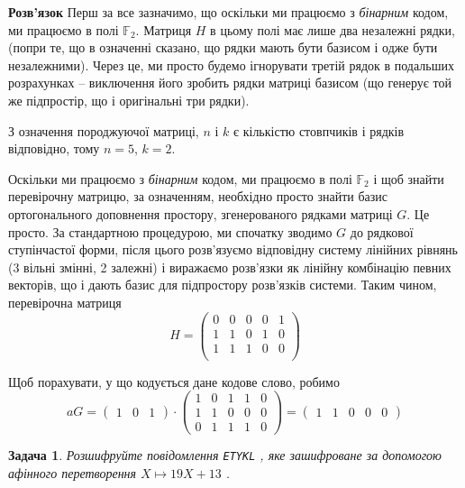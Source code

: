 \documentclass[12pt]{article} %
\newtheorem{problem}{Задача}
\newenvironment{solution}%
{\par\textbf{Розв'язок}\space }%
{\par}
\begin{document}
\begin{solution}
	Перш за все зазначимо, що оскільки ми працюємо з \textit{бінарним} кодом, ми працюємо в полі $\mathbb{F}_2$. Матриця $H$ в цьому полі має лише два незалежні рядки,
	(попри те, що в означенні сказано, що рядки мають бути базисом і одже бути незалежними). Через це, ми просто будемо ігнорувати третій рядок в подальших розрахунках --
	виключення його зробить рядки матриці базисом (що генерує той же підпростір, що і оригінальні три рядки).

	З означення породжуючої матриці, $n$ і $k$ є кількістю стовпчиків і рядків відповідно, тому $n=5$, $k=2$.

	Оскільки ми працюємо з \textit{бінарним} кодом, ми працюємо в полі $\mathbb{F}_2$ і щоб знайти перевірочну матрицю, за означенням, необхідно просто знайти базис 
	ортогонального доповнення простору, згенерованого рядками матриці $G$. Це просто. За стандартною процедурою, ми спочатку зводимо $G$ до рядкової ступінчастої форми,
	після цього розв'язуємо відповідну систему лінійних рівнянь (3 вільні змінні, 2 залежні) і виражаємо розв'язки як лінійну комбінацію певних векторів, що і дають базис
	для підпростору розв'язків системи. Таким чином, перевірочна матриця
	\[H =\begin{pmatrix}
	0 & 0 & 0 & 0 & 1\\
	1 & 1 & 0 & 1 & 0\\
	1 & 1 & 1 & 0 & 0\\
	\end{pmatrix}
	\]

	Щоб порахувати, у що кодується дане кодове слово, робимо
	\[aG=\begin{pmatrix}1 & 0 & 1\end{pmatrix}\cdot
	\begin{pmatrix}
1 & 0 & 1 & 1 & 0\\
1 & 1 & 0 & 0 & 0\\
	0 & 1 & 1 & 1 & 0\end{pmatrix}=\begin{pmatrix}1 & 1 & 0 & 0& 0\end{pmatrix}\]
\end{solution}
\begin{problem}Розшифруйте повідомлення \rm{\texttt{ETYKL}} , яке зашифроване за допомогою афінного перетворення $X\mapsto 19X + 13$ .
\end{problem}
\end{document}
